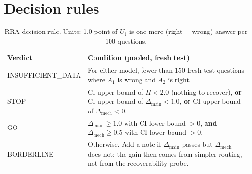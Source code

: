 \documentclass[11pt]{article}
\begin{document}
\section{Decision rules}\label{sec:rules}

\begin{table}[H]
\centering
\small
\begin{tabularx}{\textwidth}{@{}lL@{}}
\toprule
Verdict & Condition (pooled, fresh test) \\
\midrule
INSUFFICIENT\_DATA & For either model, fewer than 150 fresh-test questions where $A_1$ is wrong and $A_2$ is
  right. \\
STOP & CI upper bound of $H < 2.0$ (nothing to recover), \textbf{or} CI upper bound of
  $\Delta_{\mathrm{main}} < 1.0$, \textbf{or} CI upper bound of $\Delta_{\mathrm{mech}} < 0$. \\
GO & $\Delta_{\mathrm{main}} \ge 1.0$ with CI lower bound $> 0$, \textbf{and} $\Delta_{\mathrm{mech}} \ge 0.5$
  with CI lower bound $> 0$. \\
BORDERLINE & Otherwise. Add a note if $\Delta_{\mathrm{main}}$ passes but $\Delta_{\mathrm{mech}}$ does not:
  the gain then comes from simpler routing, not from the recoverability probe. \\
\bottomrule
\end{tabularx}
\caption{RRA decision rule. Units: 1.0 point of $U_1$ is one more (right $-$ wrong) answer per 100 questions.}
\end{table}

\end{document}
